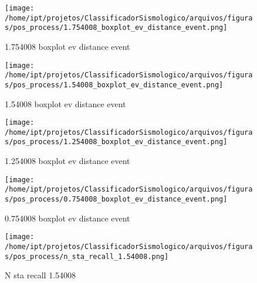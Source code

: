                     \begin{figure}[H]
                        \centering
                        \texttt{[image: /home/ipt/projetos/ClassificadorSismologico/arquivos/figuras/pos\_process/1.754008\_boxplot\_ev\_distance\_event.png]}
                        \caption{1.754008 boxplot ev distance event}
                        \label{fig:1.754008_boxplot_ev_distance_event}
                    \end{figure}
                

                    \begin{figure}[H]
                        \centering
                        \texttt{[image: /home/ipt/projetos/ClassificadorSismologico/arquivos/figuras/pos\_process/1.54008\_boxplot\_ev\_distance\_event.png]}
                        \caption{1.54008 boxplot ev distance event}
                        \label{fig:1.54008_boxplot_ev_distance_event}
                    \end{figure}
                

                    \begin{figure}[H]
                        \centering
                        \texttt{[image: /home/ipt/projetos/ClassificadorSismologico/arquivos/figuras/pos\_process/1.254008\_boxplot\_ev\_distance\_event.png]}
                        \caption{1.254008 boxplot ev distance event}
                        \label{fig:1.254008_boxplot_ev_distance_event}
                    \end{figure}
                

                    \begin{figure}[H]
                        \centering
                        \texttt{[image: /home/ipt/projetos/ClassificadorSismologico/arquivos/figuras/pos\_process/0.754008\_boxplot\_ev\_distance\_event.png]}
                        \caption{0.754008 boxplot ev distance event}
                        \label{fig:0.754008_boxplot_ev_distance_event}
                    \end{figure}
                

                    \begin{figure}[H]
                        \centering
                        \texttt{[image: /home/ipt/projetos/ClassificadorSismologico/arquivos/figuras/pos\_process/n\_sta\_recall\_1.54008.png]}
                        \caption{N sta recall 1.54008}
                        \label{fig:n_sta_recall_1.54008}
                    \end{figure}
                

